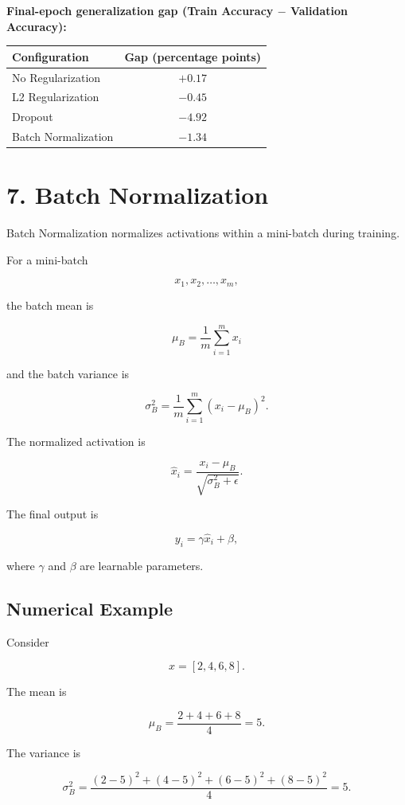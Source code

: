 \documentclass[10pt]{article}
\begin{document}
\textbf{Final-epoch generalization gap (Train Accuracy $-$ Validation Accuracy):}

\begin{center}
\begin{tabular}{|l|c|}
\hline
Configuration & Gap (percentage points)\\
\hline
No Regularization & $+0.17$\\
L2 Regularization & $-0.45$\\
Dropout & $-4.92$\\
Batch Normalization & $-1.34$\\
\hline
\end{tabular}
\end{center}

\section*{7. Batch Normalization}

Batch Normalization normalizes activations within a mini-batch during
training.

For a mini-batch

\[
x_1,x_2,\ldots,x_m,
\]

the batch mean is

\[
\mu_B=\frac{1}{m}\sum_{i=1}^{m}x_i
\]

and the batch variance is

\[
\sigma_B^2=
\frac{1}{m}\sum_{i=1}^{m}(x_i-\mu_B)^2.
\]

The normalized activation is

\[
\hat{x}_i=
\frac{x_i-\mu_B}
{\sqrt{\sigma_B^2+\epsilon}}.
\]

The final output is

\[
y_i=\gamma\hat{x}_i+\beta,
\]

where $\gamma$ and $\beta$ are learnable parameters.

\subsection*{Numerical Example}

Consider

\[
x=[2,4,6,8].
\]

The mean is

\[
\mu_B=\frac{2+4+6+8}{4}=5.
\]

The variance is

\[
\sigma_B^2=
\frac{(2-5)^2+(4-5)^2+(6-5)^2+(8-5)^2}{4}
=5.
\]
\end{document}
